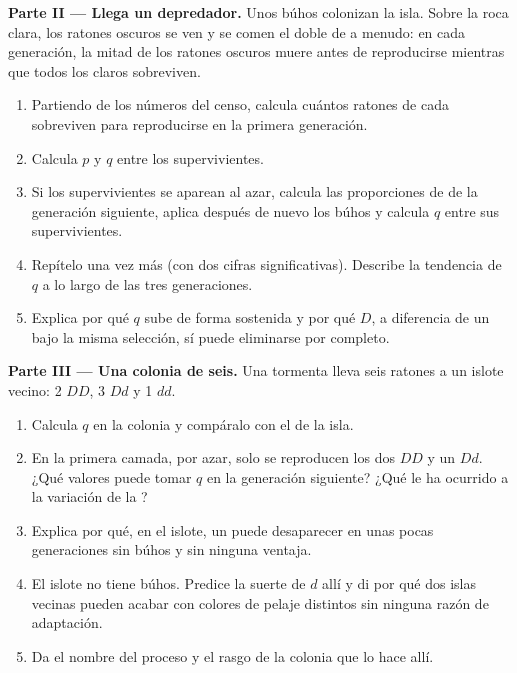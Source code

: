 \begin{problem}
\medskip
\noindent\textbf{Parte II --- Llega un depredador.}
Unos búhos colonizan la isla. Sobre la roca clara, los ratones oscuros
se ven y se comen el doble de a menudo: en cada generación, la mitad de
los ratones oscuros muere antes de reproducirse mientras que todos los
claros sobreviven.
\begin{enumerate}[resume]
  \item Partiendo de los números del censo, calcula cuántos ratones de
        cada  sobreviven para reproducirse en la primera
        generación.
  \item Calcula $p$ y $q$ entre los supervivientes.
  \item Si los supervivientes se aparean al azar, calcula las
        proporciones de  de la generación siguiente, aplica
        después de nuevo los búhos y calcula $q$ entre sus
        supervivientes.
  \item Repítelo una vez más (con dos cifras significativas). Describe
        la tendencia de $q$ a lo largo de las tres generaciones.
  \item Explica por qué $q$ sube de forma sostenida y por qué $D$, a
        diferencia de un   bajo la misma selección, sí
        puede eliminarse por completo.
\end{enumerate}

\medskip
\noindent\textbf{Parte III --- Una colonia de seis.}
Una tormenta lleva seis ratones a un islote vecino: 2 $DD$, 3 $Dd$ y
1 $dd$.
\begin{enumerate}[resume]
  \item Calcula $q$ en la colonia y compáralo con el de la isla.
  \item En la primera camada, por azar, solo se reproducen los dos $DD$
        y un $Dd$. ¿Qué valores puede tomar $q$ en la generación
        siguiente? ¿Qué le ha ocurrido a la variación de la ?
  \item Explica por qué, en el islote, un  puede desaparecer en
        unas pocas generaciones sin búhos y sin ninguna ventaja.
  \item El islote no tiene búhos. Predice la suerte de $d$ allí y di
        por qué dos islas vecinas pueden acabar con colores de pelaje
        distintos sin ninguna razón de adaptación.
  \item Da el nombre del proceso y el rasgo de la colonia que lo hace
         allí.
\end{enumerate}


\end{problem}
